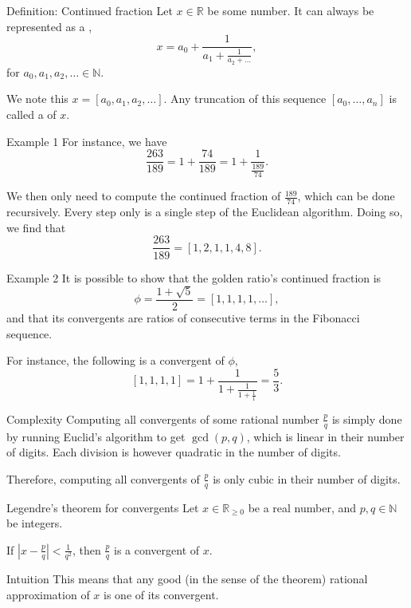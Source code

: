 \documentclass[a4paper]{article}
\begin{document}
\begin{parag}{Definition: Continued fraction}
    Let $x \in \mathbb{R}$ be some number. It can always be represented as a , 
    \[x = a_0 + \frac{1}{a_1 + \frac{1}{a_2 + \ldots}},\]
    for $a_0, a_1, a_2, \ldots \in \mathbb{N}$.

    We note this $x = \left[a_0, a_1, a_2, \ldots\right]$. Any truncation of this sequence $\left[a_0, \ldots, a_n\right]$ is called a  of $x$.

    \begin{subparag}{Example 1}
        For instance, we have
        \[\frac{263}{189} = 1 + \frac{74}{189} = 1 + \frac{1}{\frac{189}{74}}.\]

        We then only need to compute the continued fraction of $\frac{189}{74}$, which can be done recursively. Every step only is a single step of the Euclidean algorithm. Doing so, we find that 
        \[\frac{263}{189} = \left[1,2,1,1,4,8\right].\]
    \end{subparag}

    \begin{subparag}{Example 2}
        It is possible to show that the golden ratio's continued fraction is
        \[\phi = \frac{1 + \sqrt{5}}{2} = \left[1,1,1,1,\ldots\right],\]
        and that its convergents are ratios of consecutive terms in the Fibonacci sequence.

        For instance, the following is a convergent of $\phi$,
        \[\left[1, 1, 1, 1\right] = 1 + \frac{1}{1 + \frac{1}{1 + \frac{1}{1}}} = \frac{5}{3}.\]
    \end{subparag}

    \begin{subparag}{Complexity}
        Computing all convergents of some rational number $\frac{p}{q}$ is simply done by running Euclid's algorithm to get $\gcd\left(p, q\right)$, which is linear in their number of digits. Each division is however quadratic in the number of digits.

        Therefore, computing all convergents of $\frac{p}{q}$ is only cubic in their number of digits.
    \end{subparag} 
\end{parag}

\begin{parag}{Legendre's theorem for convergents}
    Let $x \in \mathbb{R}_{\geq 0}$ be a real number, and $p, q \in \mathbb{N}$ be integers.

    If $\left|x - \frac{p}{q}\right| < \frac{1}{q^2}$, then $\frac{p}{q}$ is a convergent of $x$.

    \begin{subparag}{Intuition}
        This means that any good (in the sense of the theorem) rational approximation of $x$ is one of its convergent.
    \end{subparag}
\end{parag}
\end{document}
